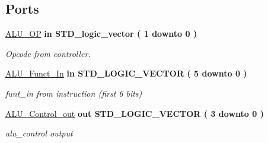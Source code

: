 \subsection*{Ports}
 \begin{DoxyCompactItemize}
\item 
\hyperlink{class_a_l_u___control_ab6a5d61e888c23ba77524db9a1b57d00}{A\-L\-U\-\_\-\-O\-P}  {\bfseries {\bfseries \textcolor{vhdlkeyword}{in}\textcolor{vhdlchar}{ }}} {\bfseries \textcolor{comment}{S\-T\-D\-\_\-logic\-\_\-vector}\textcolor{vhdlchar}{ }\textcolor{vhdlchar}{(}\textcolor{vhdlchar}{ }\textcolor{vhdlchar}{ } \textcolor{vhdldigit}{1} \textcolor{vhdlchar}{ }\textcolor{vhdlchar}{ }\textcolor{vhdlchar}{ }\textcolor{vhdlkeyword}{downto}\textcolor{vhdlchar}{ }\textcolor{vhdlchar}{ }\textcolor{vhdlchar}{ } \textcolor{vhdldigit}{0} \textcolor{vhdlchar}{ }\textcolor{vhdlchar}{)}\textcolor{vhdlchar}{ }} 
\begin{DoxyCompactList}\small\item\em Opcode from controller. \end{DoxyCompactList}\item 
\hyperlink{class_a_l_u___control_a7a955f01ce8523310216d431d36b3355}{A\-L\-U\-\_\-\-Funct\-\_\-\-In}  {\bfseries {\bfseries \textcolor{vhdlkeyword}{in}\textcolor{vhdlchar}{ }}} {\bfseries \textcolor{comment}{S\-T\-D\-\_\-\-L\-O\-G\-I\-C\-\_\-\-V\-E\-C\-T\-O\-R}\textcolor{vhdlchar}{ }\textcolor{vhdlchar}{(}\textcolor{vhdlchar}{ }\textcolor{vhdlchar}{ } \textcolor{vhdldigit}{5} \textcolor{vhdlchar}{ }\textcolor{vhdlchar}{ }\textcolor{vhdlchar}{ }\textcolor{vhdlkeyword}{downto}\textcolor{vhdlchar}{ }\textcolor{vhdlchar}{ }\textcolor{vhdlchar}{ } \textcolor{vhdldigit}{0} \textcolor{vhdlchar}{ }\textcolor{vhdlchar}{)}\textcolor{vhdlchar}{ }} 
\begin{DoxyCompactList}\small\item\em funt\-\_\-in from instruction (first 6 bits) \end{DoxyCompactList}\item 
\hyperlink{class_a_l_u___control_a8ec3ba373cae4fe06c7d82b2ce12561f}{A\-L\-U\-\_\-\-Control\-\_\-out}  {\bfseries {\bfseries \textcolor{vhdlkeyword}{out}\textcolor{vhdlchar}{ }}} {\bfseries \textcolor{comment}{S\-T\-D\-\_\-\-L\-O\-G\-I\-C\-\_\-\-V\-E\-C\-T\-O\-R}\textcolor{vhdlchar}{ }\textcolor{vhdlchar}{(}\textcolor{vhdlchar}{ }\textcolor{vhdlchar}{ } \textcolor{vhdldigit}{3} \textcolor{vhdlchar}{ }\textcolor{vhdlchar}{ }\textcolor{vhdlchar}{ }\textcolor{vhdlkeyword}{downto}\textcolor{vhdlchar}{ }\textcolor{vhdlchar}{ }\textcolor{vhdlchar}{ } \textcolor{vhdldigit}{0} \textcolor{vhdlchar}{ }\textcolor{vhdlchar}{)}\textcolor{vhdlchar}{ }} 
\begin{DoxyCompactList}\small\item\em alu\-\_\-control output \end{DoxyCompactList}\end{DoxyCompactItemize}



